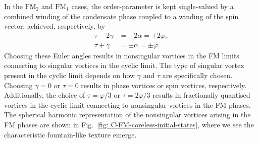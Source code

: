 In the \(\text{FM}_2\) and \(\text{FM}_1\) cases, the order-parameter is kept
single-valued by a combined winding of the condensate phase coupled to a winding
of the spin vector, achieved, respectively, by
\begin{align}\label{eq: coreless-euler-limits-FM-2}
    \tau - 2\gamma &= \pm 2\alpha = \pm 2\varphi, \\
    \tau + \gamma &= \pm\alpha=\pm\varphi.\label{eq: coreless-euler-limits-FM-1}
\end{align}
Choosing these Euler angles results in nonsingular vortices in the FM limits
connecting to singular vortices in the cyclic limit.
The type of singular vortex present in the cyclic limit depends on how
\(\gamma\) and \(\tau\) are specifically chosen.
Choosing \(\gamma = 0 \) or \(\tau = 0\) results in phase vortices or spin
vortices, respectively.
Additionally, the choice of \(\tau=\varphi/3\) or \(\tau=2\varphi/3\) results
in fractionally quantised vortices in the cyclic limit connecting to nonsingular
vortices in the FM phases.
The spherical harmonic representation of the nonsingular vortices arising in the
FM phases are shown in Fig.~\ref{fig: C-FM-coreless-initial-states}, where we
see the characteristic fountain-like texture emerge.
